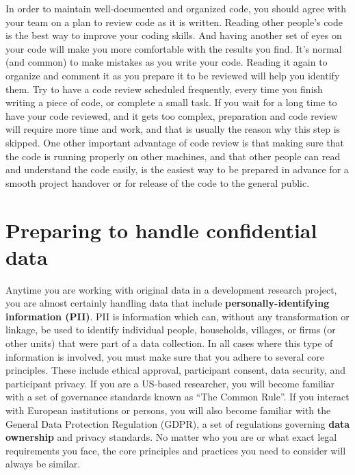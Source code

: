 In order to maintain well-documented and organized code,
you should agree with your team on a plan to review code as it is written.
Reading other people's code is the best way to improve your coding skills.
And having another set of eyes on your code will make you more comfortable with the results you find.
It's normal (and common) to make mistakes as you write your code.
Reading it again to organize and comment it as you prepare it to be reviewed will help you identify them.
Try to have a code review scheduled frequently,
every time you finish writing a piece of code, or complete a small task.
If you wait for a long time to have your code reviewed, and it gets too complex,
preparation and code review will require more time and work,
and that is usually the reason why this step is skipped.
One other important advantage of code review is that
making sure that the code is running properly on other machines,
and that other people can read and understand the code easily,
is the easiest way to be prepared in advance for a smooth project handover
or for release of the code to the general public.


\section{Preparing to handle confidential data}

Anytime you are working with original data in a development research project,
you are almost certainly handling data that include
\textbf{personally-identifying	information (PII)}.
PII is information which can, without any transformation or linkage,
be used to identify individual people, households, villages,
or firms (or other units) that were part of a data collection.
In all cases where this type of information is involved,
you must make sure that you adhere to several core principles.
These include ethical approval, participant consent,
data security, and participant privacy.
If you are a US-based researcher, you will become familiar
with a set of governance standards known as ``The Common Rule''.
If you interact with European institutions or persons,
you will also become familiar with the General Data Protection Regulation (GDPR),
a set of regulations governing \textbf{data ownership} and privacy standards.
No matter who you are or what exact legal requirements you face,
the core principles and practices you need to consider will always be similar.

